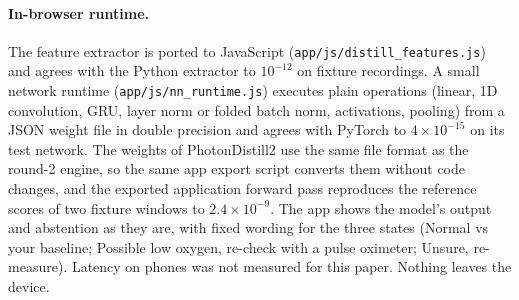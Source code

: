 \paragraph{In-browser runtime.} The feature extractor is ported to JavaScript (\texttt{app/js/distill\_\allowbreak features.js}) and agrees with the Python extractor to $10^{-12}$ on fixture recordings. A small network runtime (\texttt{app/js/nn\_\allowbreak runtime.js}) executes plain operations (linear, 1D convolution, GRU, layer norm or folded batch norm, activations, pooling) from a JSON weight file in double precision and agrees with PyTorch to $4\times10^{-15}$ on its test network. The weights of PhotonDistill2 use the same file format as the round-2 engine, so the same app export script converts them without code changes, and the exported application forward pass reproduces the reference scores of two fixture windows to $2.4\times10^{-9}$. The app shows the model's output and abstention as they are, with fixed wording for the three states (Normal vs your baseline; Possible low oxygen, re-check with a pulse oximeter; Unsure, re-measure). Latency on phones was not measured for this paper. Nothing leaves the device.
\else
{}
\fi

